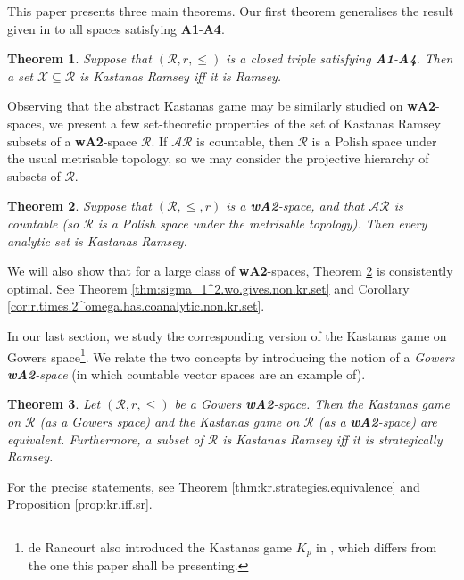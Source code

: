 \documentclass[11pt,reqno]{amsart}
\theoremstyle{plain}
\numberwithin{equation}{section}
\newtheorem{theorem}{Theorem}[section]
\theoremstyle{definition}
\newcommand{\cal}{\mathcal}
\newcommand{\X}{\cal{X}}
\begin{document}
This paper presents three main theorems. Our first theorem generalises the result given in \cite{CD23} to all spaces satisfying \textbf{A1}-\textbf{A4}.

\begin{theorem}
\label{thm:kr.iff.r}
    Suppose that $(\cal{R},r,\leq)$ is a closed triple satisfying \textbf{A1}-\textbf{A4}. Then a set $\X \subseteq \cal{R}$ is Kastanas Ramsey iff it is Ramsey.
\end{theorem}

Observing that the abstract Kastanas game may be similarly studied on \textbf{wA2}-spaces, we present a few set-theoretic properties of the set of Kastanas Ramsey subsets of a \textbf{wA2}-space $\cal{R}$. If $\cal{AR}$ is countable, then $\cal{R}$ is a Polish space under the usual metrisable topology, so we may consider the projective hierarchy of subsets of $\cal{R}$. 

\begin{theorem}
\label{thm:analytic.is.kr}
    Suppose that $(\cal{R},\leq,r)$ is a \textbf{wA2}-space, and that $\cal{AR}$ is countable (so $\cal{R}$ is a Polish space under the metrisable topology). Then every analytic set is Kastanas Ramsey. 
\end{theorem}

We will also show that for a large class of \textbf{wA2}-spaces, Theorem \ref{thm:analytic.is.kr} is consistently optimal. See Theorem \ref{thm:sigma_1^2.wo.gives.non.kr.set} and Corollary \ref{cor:r.times.2^omega.has.coanalytic.non.kr.set}.

In our last section, we study the corresponding version of the Kastanas game on Gowers space\footnote{de Rancourt also introduced the Kastanas game $K_p$ in \cite{d20}, which differs from the one this paper shall be presenting.}. We relate the two concepts by introducing the notion of a \emph{Gowers \textbf{wA2}-space} (in which countable vector spaces are an example of).

\begin{theorem}
    Let $(\cal{R},r,\leq)$ be a Gowers \textbf{wA2}-space. Then the Kastanas game on $\cal{R}$ (as a Gowers space) and the Kastanas game on $\cal{R}$ (as a \textbf{wA2}-space) are equivalent. Furthermore, a subset of $\cal{R}$ is Kastanas Ramsey iff it is strategically Ramsey.
\end{theorem}

For the precise statements, see Theorem \ref{thm:kr.strategies.equivalence} and Proposition \ref{prop:kr.iff.sr}.
\end{document}
